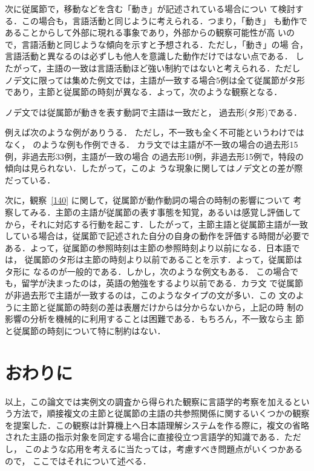 次に従属節で，移動などを含む「動き」が記述されている場合につい
て検討する．この場合も，言語活動と同じように考えられる．つまり，「動き」
も動作であることからして外部に現れる事象であり，外部からの観察可能性が高
いので，言語活動と同じような傾向を示すと予想される．ただし，「動き」の場
合，言語活動と異なるのは必ずしも他人を意識した動作だけではない点である．
したがって，主語の一致は言語活動ほど強い制約ではないと考えられる．ただし
ノデ文に限っては集めた例文では，主語が一致する場合5例は全て従属節がタ形
であり，主節と従属節の時刻が異なる．よって，次のような観察となる．

\begin{obs}\label{140}
ノデ文では従属節が動きを表す動詞で主語は一致だと，
過去形{\rm (}タ形{\rm )}である．
\end{obs}
例えば次のような例がありうる．
ただし，不一致も全く不可能というわけではなく，
のような例も作例できる．
カラ文では主語が不一致の場合の過去形15例，非過去形33例，主語が一致の場合
の過去形10例，非過去形15例で，特段の傾向は見られない．したがって，このよ
うな現象に関してはノデ文との差が際だっている．

次に，観察~\ref{140} に関して，従属節が動作動詞の場合の時制の影響について
考察してみる．主節の主語が従属節の表す事態を知覚，あるいは感覚し評価して
から，それに対応する行動を起こす．したがって，主節主語と従属節主語が一致
している場合は，従属節で記述された自分の自身の動作を評価する時間が必要で
ある．よって，従属節の参照時刻は主節の参照時刻より以前になる．日本語では，
従属節のタ形は主節の時刻より以前であることを示す．よって，従属節はタ形に
なるのが一般的である．しかし，次のような例文もある．
この場合でも，留学が決まったのは，英語の勉強をするより以前である．カラ文
で従属節が非過去形で主語が一致するのは，このようなタイプの文が多い．この
文のように主節と従属節の時刻の差は表層だけからは分からないから，上記の時
制の影響の分析を機械的に利用することは困難である．もちろん，不一致なら主
節と従属節の時刻について特に制約はない．

\section{おわりに}

以上，この論文では実例文の調査から得られた観察に言語学的考察を加えるとい
う方法で，順接複文の主節と従属節の主語の共参照関係に関するいくつかの観察
を提案した．この観察は計算機上へ日本語理解システムを作る際に，複文の省略
された主語の指示対象を同定する場合に直接役立つ言語学的知識である．ただし，
このような応用を考えるに当たっては，考慮すべき問題点がいくつかあるので，
ここではそれについて述べる．

